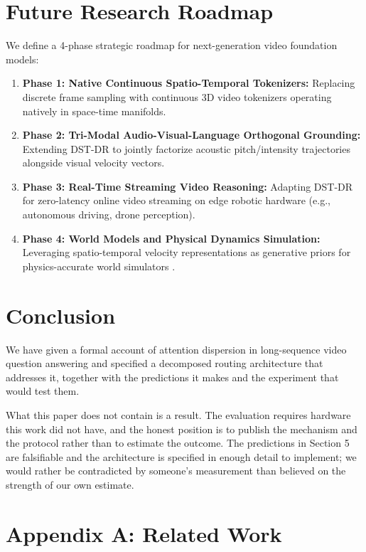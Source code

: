 \documentclass{article}
\begin{document}
\section{Future Research Roadmap}


We define a 4-phase strategic roadmap for next-generation video foundation models:
\begin{enumerate}
  \item \textbf{Phase 1: Native Continuous Spatio-Temporal Tokenizers:} Replacing discrete frame sampling with continuous 3D video tokenizers operating natively in space-time manifolds.
  \item \textbf{Phase 2: Tri-Modal Audio-Visual-Language Orthogonal Grounding:} Extending DST-DR to jointly factorize acoustic pitch/intensity trajectories alongside visual velocity vectors.
  \item \textbf{Phase 3: Real-Time Streaming Video Reasoning:} Adapting DST-DR for zero-latency online video streaming on edge robotic hardware (e.g., autonomous driving, drone perception).
  \item \textbf{Phase 4: World Models and Physical Dynamics Simulation:} Leveraging spatio-temporal velocity representations as generative priors for physics-accurate world simulators \cite{arxiv_2501_02497}.
\end{enumerate}




\section{Conclusion}


We have given a formal account of attention dispersion in long-sequence video question answering and specified a decomposed routing architecture that addresses it, together with the predictions it makes and the experiment that would test them.

What this paper does not contain is a result. The evaluation requires hardware this work did not have, and the honest position is to publish the mechanism and the protocol rather than to estimate the outcome. The predictions in Section 5 are falsifiable and the architecture is specified in enough detail to implement; we would rather be contradicted by someone's measurement than believed on the strength of our own estimate.




\section{Appendix A: Related Work}
\end{document}
